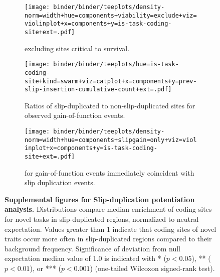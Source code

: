\begin{figure*}

\begin{subfigure}{0.5\textwidth}
\texttt{[image: binder/binder/teeplots/density-norm=width+hue=components+viability=exclude+viz=violinplot+x=components+y=is-task-coding-site+ext=.pdf]}
\caption{%
\footnotesize
excluding sites critical to survival.
}
\end{subfigure}%
\begin{subfigure}{0.5\textwidth}
\texttt{[image: binder/binder/teeplots/hue=is-task-coding-site+kind=swarm+viz=catplot+x=components+y=prev-slip-insertion-cumulative-count+ext=.pdf]}
\caption{%
\footnotesize
Ratios of slip-duplicated to non-slip-duplicated sites for observed gain-of-function events.
}
\end{subfigure}

\begin{subfigure}{0.5\textwidth}
\texttt{[image: binder/binder/teeplots/density-norm=width+hue=components+slipgain=only+viz=violinplot+x=components+y=is-task-coding-site+ext=.pdf]}
\caption{%
\footnotesize
for gain-of-function events immediately coincident with slip duplication events.
}
\end{subfigure}

\caption{%
\textbf{Supplemental figures for Slip-duplication potentiation analysis.}
Distributions compare median enrichment of coding sites for novel tasks in slip-duplicated regions, normalized to neutral expectation.
  Values greater than 1 indicate that coding sites of novel traits occur more often in slip-duplicated regions compared to their background frequency.
  Significance of deviation from null expectation median value of 1.0 is indicated with * ($p < 0.05$), ** ($p < 0.01$), or *** ($p < 0.001$) (one-tailed Wilcoxon signed-rank test).
}
\label{fig:potentiation-supp}
\end{figure*}



